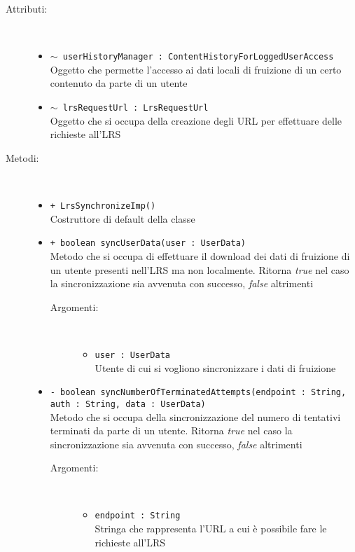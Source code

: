 \documentclass[../Tesi.tex]{subfiles}
\begin{document}
		\begin{description}
			\item[Attributi:] \
			\begin{itemize}
				\item \texttt{$\sim$ userHistoryManager : ContentHistoryForLoggedUserAccess}\\
				Oggetto che permette l'accesso ai dati locali di fruizione di un certo contenuto da parte di un utente

				\item \texttt{$\sim$ lrsRequestUrl : LrsRequestUrl}\\
				Oggetto che si occupa della creazione degli URL per effettuare delle richieste all'LRS
			\end{itemize}

			\item[Metodi:] \
			\begin{itemize}
				\item \texttt{+ LrsSynchronizeImp()}\\
				Costruttore di default della classe 
				
				\item \texttt{+ boolean syncUserData(user : UserData)}\\
				Metodo che si occupa di effettuare il download dei dati di fruizione di un utente presenti nell'LRS ma non localmente. Ritorna \textit{true} nel caso la sincronizzazione sia avvenuta con successo, \textit{false} altrimenti
				\begin{description}
					\item[Argomenti:] \
					\begin{itemize}
						\item \texttt{user : UserData}\\
						Utente di cui si vogliono sincronizzare i dati di fruizione
					\end{itemize}
				\end{description}

				\item \texttt{- boolean syncNumberOfTerminatedAttempts(endpoint : String, auth : String, data : UserData)}\\
				Metodo che si occupa della sincronizzazione del numero di tentativi terminati da parte di un utente. Ritorna \textit{true} nel caso la sincronizzazione sia avvenuta con successo, \textit{false} altrimenti
				\begin{description}
					\item[Argomenti:] \
					\begin{itemize}
						\item \texttt{endpoint : String}\\
						Stringa che rappresenta l'URL a cui è possibile fare le richieste all'LRS


\end{itemize}
\end{description}
\end{itemize}
\end{description}
\end{document}
